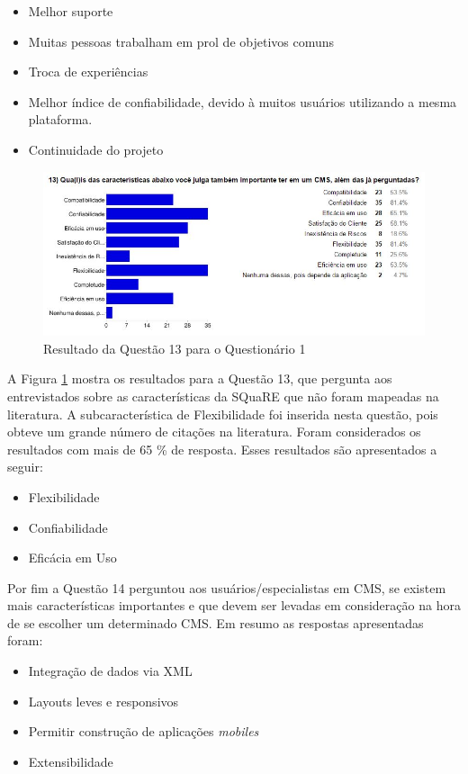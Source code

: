 \begin{itemize}
\item Melhor suporte
\item Muitas pessoas trabalham em prol de objetivos comuns
\item Troca de experiências
\item Melhor índice de confiabilidade, devido à muitos usuários utilizando a mesma plataforma. 
\item Continuidade do projeto

\end{itemize}
\begin{figure}[h]
\centering
\includegraphics[keepaspectratio=true,scale=0.7]{figuras/Ques_1/q13.jpg}
\caption{Resultado da Questão 13 para o Questionário 1}
\label{Q13_Q1}
\end{figure}

A Figura \ref{Q13_Q1} mostra os resultados para a Questão 13, que pergunta aos entrevistados sobre as características da SQuaRE que não foram mapeadas na literatura. A subcaracterística de Flexibilidade foi inserida nesta questão, pois obteve um grande número de citações na literatura. Foram considerados os resultados com mais de 65 \% de resposta. Esses resultados são apresentados a seguir: 

\begin{itemize}
\item Flexibilidade
\item Confiabilidade
\item Eficácia em Uso

\end{itemize}

Por fim a Questão 14 perguntou aos usuários/especialistas em CMS, se existem mais características importantes e que devem ser levadas em consideração na hora de se escolher um determinado CMS. Em resumo as respostas apresentadas foram:

\begin{itemize}
\item Integração de dados via XML
\item Layouts leves e responsivos
\item Permitir construção de aplicações \textit{mobiles}
\item Extensibilidade
\end{itemize}

